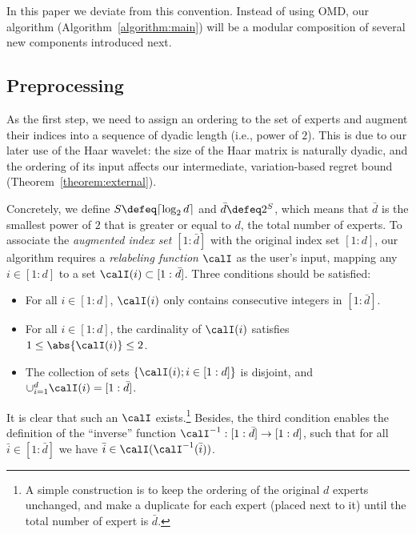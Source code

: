 \documentclass[10pt]{article}
\begin{document}
In this paper we deviate from this convention. Instead of using OMD, our algorithm (Algorithm~\ref{algorithm:main}) will be a modular composition of several new components introduced next. 

\subsection{Preprocessing}\label{subsection:preprocessing}

As the first step, we need to assign an ordering to the set of experts and augment their indices into a sequence of dyadic length (i.e., power of $2$). This is due to our later use of the Haar wavelet: the size of the Haar matrix is naturally dyadic, and the ordering of its input affects our intermediate, variation-based regret bound (Theorem~\ref{theorem:external}). 

Concretely, we define $S\defeq\lceil\log_2 d\rceil$ and $\bar d\defeq 2^S$, which means that $\bar d$ is the smallest power of $2$ that is greater or equal to $d$, the total number of experts. To associate the \emph{augmented index set} $[1:\bar d]$ with the original index set $[1:d]$, our algorithm requires a \emph{relabeling function} $\calI$ as the user's input, mapping any $i\in[1:d]$ to a set $\calI(i)\subset[1:\bar d]$. Three conditions should be satisfied: 
\begin{itemize}
\item For all $i\in[1:d]$, $\calI(i)$ only contains consecutive integers in $[1:\bar d]$.
\item For all $i\in[1:d]$, the cardinality of $\calI(i)$ satisfies $1\leq \abs{\calI(i)}\leq 2$.
\item The collection of sets $\{\calI(i);i\in[1:d]\}$ is disjoint, and $\cup_{i=1}^d\calI(i)=[1:\bar d]$. 
\end{itemize}
It is clear that such an $\calI$ exists.\footnote{A simple construction is to keep the ordering of the original $d$ experts unchanged, and make a duplicate for each expert (placed next to it) until the total number of expert is $\bar d$.} Besides, the third condition enables the definition of the ``inverse'' function $\calI^{-1}:[1:\bar d]\rightarrow[1:d]$, such that for all $\bar i\in[1:\bar d]$ we have $\bar i\in\calI(\calI^{-1}(\bar i))$.
\end{document}

